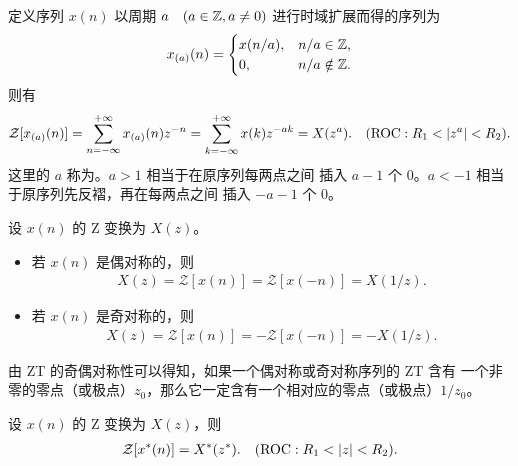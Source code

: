 \begin{property}[ZT 的时域扩展性质]
    定义序列 $x(n)$ 以周期 $a \quad (a \in \mathbb{Z}, a \neq 0)$ 进行时域扩展而得的序列为
    \begin{align*}
        x_{(a)}(n) = \begin{cases}
            x(n/a), & n/a \in \mathbb{Z}, \\
            0, & n/a \notin \mathbb{Z}.
        \end{cases}
    \end{align*}
    则有
    \begin{align*}
        \mathcal{Z}[x_{(a)}(n)] = \sum_{n=-\infty}^{+\infty} x_{(a)}(n) z^{-n} = \sum_{k=-\infty}^{+\infty} x(k) z^{-ak} = X(z^a). \quad (\text{ROC}: R_1 < \left|z^a\right| < R_2).
    \end{align*}
    这里的 $a$ 称为。$a > 1$ 相当于在原序列每两点之间
    插入 $a - 1$ 个 $0$。$a < - 1$ 相当于原序列先反褶，再在每两点之间
    插入 $-a - 1$ 个 $0$。
\end{property}

\begin{property}[ZT 的奇偶对称性质]
    设 $x(n)$ 的 Z 变换为 $X(z)$。
    \begin{itemize}
        \item 若 $x(n)$ 是偶对称的，则
            \begin{align*}
                X(z) = \mathcal{Z}[x(n)] = \mathcal{Z}[x(-n)] = X(1/z).
            \end{align*}
        \item 若 $x(n)$ 是奇对称的，则
            \begin{align*}
                X(z) = \mathcal{Z}[x(n)] = -\mathcal{Z}[x(-n)] = -X(1/z).
            \end{align*}
    \end{itemize}
\end{property}

\begin{corollary}
    由 ZT 的奇偶对称性可以得知，如果一个偶对称或奇对称序列的 ZT 含有
    一个非零的零点（或极点）$z_0$，那么它一定含有一个相对应的零点（或极点）$1/z_0$。
\end{corollary}

\begin{property}[ZT 的时域共轭性质]
    设 $x(n)$ 的 Z 变换为 $X(z)$，则
    \begin{align*}
        \mathcal{Z}[x^*(n)] = X^*(z^*). \quad (\text{ROC}: R_1 < \left|z\right| < R_2).
    \end{align*}
\end{property}

